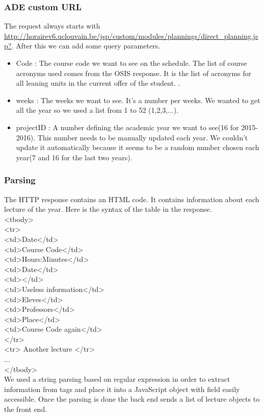 \documentclass{eplmastersthesis}
\newcommand\tab[1][0.5cm]{\hspace*{#1}}
\begin{document}
\subsubsection{ADE custom URL}
The request always starts with \url{http://horairev6.uclouvain.be/jsp/custom/modules/plannings/direct_planning.jsp?}. After this we can add some query parameters.
\begin{itemize}
\item Code : The course code we want to see on the schedule. The list of course acronyms used comes from the OSIS response. It is the list of acronyms for all leaning units in the current offer of the student. .
\item weeks : The weeks we want to see. It's a number per weeks. We wanted to get all the year so we used a list from 1 to 52 (1,2,3,...).
\item projectID : A number defining the academic year we want to see(16 for 2015-2016). This number needs to be manually updated each year. We couldn't update it automatically because it seems to be a random number chosen each year(7 and 16 for the last two years).
\end{itemize}

\subsubsection{Parsing}
The HTTP response contains an HTML code. It contains information about each lecture of the year. Here is the syntax of the table in the response.\\
<tbody>\\
\tab <tr>\\
\tab \tab <td>Date</td>\\
\tab \tab <td>Course Code</td>\\
\tab \tab <td>Hours:Minutes</td>\\
\tab \tab <td>Date</td>\\
\tab \tab <td></td>\\
\tab \tab <td>Useless information</td>\\
\tab \tab <td>Eleves</td>\\
\tab \tab <td>Professors</td>\\
\tab \tab <td>Place</td>\\
\tab \tab <td>Course Code again</td>\\
\tab </tr>\\
\tab <tr> Another lecture </tr>\\
\tab ...\\
</tbody>\\
We used a string parsing based on regular expression in order to extract information from tags and place it into a JavaScript object with field easily accessible. Once the parsing is done the back end sends a list of lecture objects to the front end.
\end{document}
